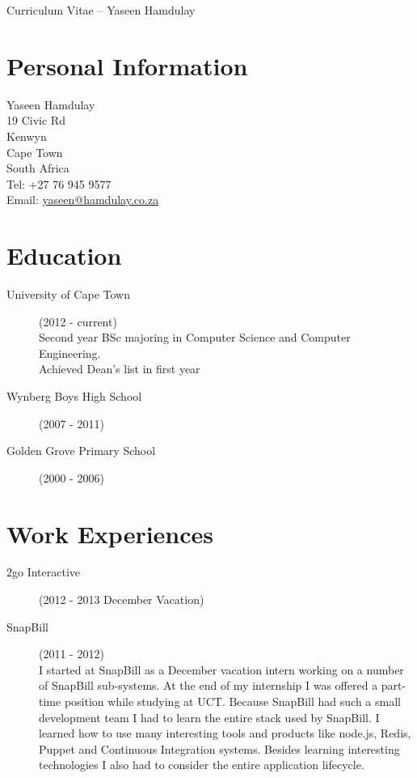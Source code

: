 \documentclass[margin,line,a4paper]{resume}
\begin{document}
    {\sc \Large Curriculum Vitae -- Yaseen Hamdulay}
    \begin{resume}
        \vspace{0.5cm}

        \section{\mysidestyle Personal Information}
            Yaseen Hamdulay\\
            19 Civic Rd\\ %
            Kenwyn\\
            Cape Town\\
            South Africa\\
            Tel: +27 76 945 9577\\
            Email: \href{mailto:yaseen@hamdulay.co.za}{yaseen@hamdulay.co.za}\\

        \section{\mysidestyle Education}
            \begin{description}
                \item[University of Cape Town] (2012 - current) \\
                    Second year BSc majoring in Computer Science and Computer Engineering. \\
                    Achieved Dean's list in first year
                \item[Wynberg Boys High School] (2007 - 2011)
                \item[Golden Grove Primary School] (2000 - 2006)
            \end{description}

        \section{\mysidestyle Work Experiences}
            \begin{description}
                \item[2go Interactive] (2012 - 2013 December Vacation)
                \item[SnapBill] (2011 - 2012) \\
                    I started at SnapBill as a December vacation intern working on a number of SnapBill sub-systems. At the end of my internship I was offered a part-time position while studying at UCT. Because SnapBill had such a small development team I had to learn the entire stack used by SnapBill. I learned how to use many interesting tools and products like node.js, Redis, Puppet and Continuous Integration systems. Besides learning interesting technologies I also had to
                    consider the entire application lifecycle. 


\end{description}
\end{resume}
\end{document}
